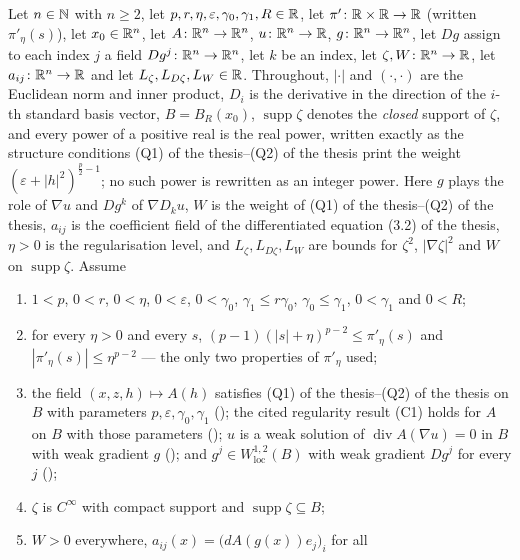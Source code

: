 \begin{helper}
Let $n\in\mathbb{N}$ with $n\ge2$, let $p,r,\eta,\varepsilon,\gamma_0,\gamma_1,R\in\mathbb{R}$,
let $\pi'\colon\mathbb{R}\times\mathbb{R}\to\mathbb{R}$ (written $\pi'_\eta(s)$), let $x_0\in\mathbb{R}^n$, let
$A\colon\mathbb{R}^n\to\mathbb{R}^n$, $u\colon\mathbb{R}^n\to\mathbb{R}$, $g\colon\mathbb{R}^n\to\mathbb{R}^n$, let $Dg$ assign
to each index $j$ a field $Dg^j\colon\mathbb{R}^n\to\mathbb{R}^n$, let $k$ be an index, let
$\zeta,W\colon\mathbb{R}^n\to\mathbb{R}$, let $a_{ij}\colon\mathbb{R}^n\to\mathbb{R}$ and let
$L_\zeta,L_{D\zeta},L_W\in\mathbb{R}$.  Throughout, $|\cdot|$ and $(\cdot,\cdot)$ are
the Euclidean norm and inner product, $D_i$ is the derivative in the direction
of the $i$-th standard basis vector, $B=B_R(x_0)$, $\operatorname{supp}\zeta$
denotes the \emph{closed} support of $\zeta$, and every power of a positive real
is the real power, written exactly as the structure conditions
(Q1) of the thesis--(Q2) of the thesis print the weight
$(\varepsilon+|h|^2)^{\frac p2-1}$; no such power is rewritten as an integer
power.  Here $g$ plays the role of $\nabla u$ and $Dg^k$ of $\nabla D_ku$, $W$
is the weight of (Q1) of the thesis--(Q2) of the thesis, $a_{ij}$ is the coefficient
field of the differentiated equation (3.2) of the thesis, $\eta>0$ is the
regularisation level, and $L_\zeta,L_{D\zeta},L_W$ are bounds for $\zeta^2$,
$|\nabla\zeta|^2$ and $W$ on $\operatorname{supp}\zeta$.  Assume
\begin{enumerate}
\item[(H1)] $1<p$, $0<r$, $0<\eta$, $0<\varepsilon$, $0<\gamma_0$,
  $\gamma_1\le r\gamma_0$, $\gamma_0\le\gamma_1$, $0<\gamma_1$ and $0<R$;
\item[(H2)] for every $\eta>0$ and every $s$,
  $(p-1)(|s|+\eta)^{p-2}\le\pi'_\eta(s)$ and
  $|\pi'_\eta(s)|\le\eta^{p-2}$ --- the only two properties of $\pi'_\eta$ used;
\item[(H3)] the field $(x,z,h)\mapsto A(h)$ satisfies
  (Q1) of the thesis--(Q2) of the thesis on $B$ with parameters
  $p,\varepsilon,\gamma_0,\gamma_1$ (); the cited
  regularity result (C1) holds for $A$ on $B$ with those parameters
  (); $u$ is a weak solution of
  $\operatorname{div}A(\nabla u)=0$ in $B$ with weak gradient $g$
  (); and $g^j\in W^{1,2}_{\mathrm{loc}}(B)$ with
  weak gradient $Dg^j$ for every $j$ ();
\item[(H4)] $\zeta$ is $C^\infty$ with compact support and
  $\operatorname{supp}\zeta\subseteq B$;
\item[(H5)] $W>0$ everywhere, $a_{ij}(x)=\bigl(dA(g(x))e_j\bigr)_i$ for all

\end{enumerate}
\end{helper}
